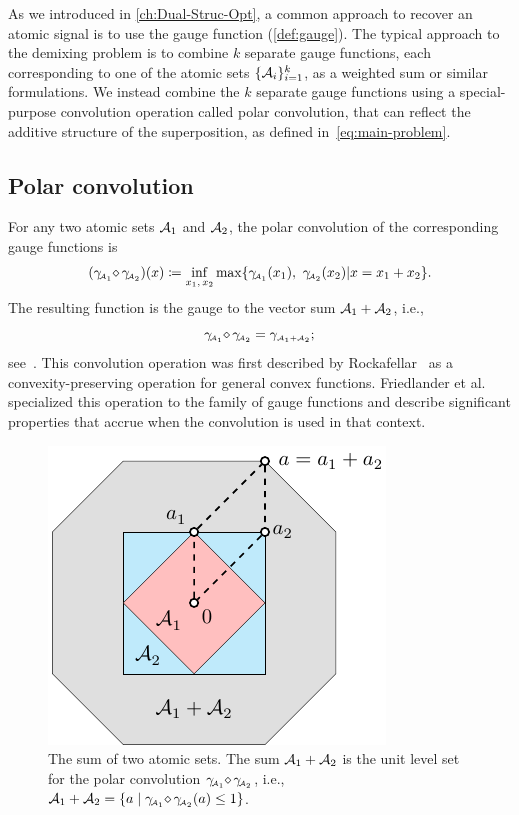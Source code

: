 As we introduced in \autoref{ch:Dual-Struc-Opt}, a common approach to recover an atomic signal is to use the gauge function (\autoref{def:gauge}). The typical approach to the demixing problem is to combine $k$ separate gauge functions, each corresponding to one of the atomic sets $\{\mathcal{A}_i\}_{i=1}^k$, as a weighted sum or similar formulations. We instead combine the $k$ separate gauge functions using a special-purpose convolution operation called polar convolution, that can reflect the additive structure of the superposition, as defined in~\eqref{eq:main-problem}.

\subsection{Polar convolution} \label{sec-polar-deconvolution-into-components}

For any two atomic sets $\mathcal{A}_1$ and $\mathcal{A}_2$, the polar convolution of the corresponding gauge functions is 
\[
  (\gamma_{\!\scriptscriptstyle\mathcal{A}_1}\!\mathop{\diamond}\gamma_{\!\scriptscriptstyle\mathcal{A}_2})(x)
  \coloneqq  \inf_{x_1,\,x_2}\max\{\gamma_{\!\scriptscriptstyle\mathcal{A}_1}(x_1),\ \gamma_{\!\scriptscriptstyle\mathcal{A}_2}(x_2) | x = x_1+x_2\}.
\]
The resulting function is the gauge to the vector sum $\mathcal{A}_1+\mathcal{A}_2$, i.e.,
\begin{equation}\label{eq-polar-convolution-sum}
  \gamma_{\!\scriptscriptstyle\mathcal{A}_1}\!\mathop{\diamond}\gamma_{\!\scriptscriptstyle\mathcal{A}_2} = \gamma_{\scriptscriptstyle\mathcal{A}_1+\mathcal{A}_2};
\end{equation}
see~\cite[Proposition~6.2]{friedlander2019polarconvolution}. This convolution operation was first described by Rockafellar~\cite[Theorem~5.8]{rockafellar1970convex} as a convexity-preserving operation for general convex functions. Friedlander et al.~\cite{friedlander2019polarconvolution} specialized this operation to the family of gauge functions and describe significant properties that accrue when the convolution is used in that context.

\begin{figure}[t]
    \centering
    \includegraphics[page=1]{./figures/illustrations2.pdf}
    \caption{The sum of two atomic sets. The sum \(\mathcal{A}_1+\mathcal{A}_2\) is the unit level set for the polar convolution $\gamma_{\!\scriptscriptstyle\mathcal{A}_1}\!\mathop{\diamond}\gamma_{\!\scriptscriptstyle\mathcal{A}_2}$, i.e., $\mathcal{A}_1+\mathcal{A}_2 = \{a \mid \gamma_{\!\scriptscriptstyle\mathcal{A}_1}\!\mathop{\diamond}\gamma_{\!\scriptscriptstyle\mathcal{A}_2}(a) \leq 1\}$.\label{fig:sum-sets}}
\end{figure}

